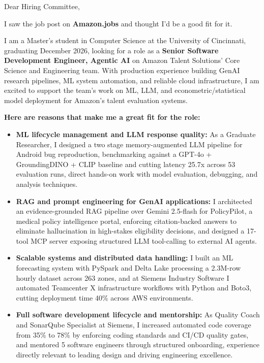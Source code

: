 \documentclass[11pt]{letter}
\date{}
\begin{document}
\begin{letter}{}

\opening{Dear Hiring Committee,}

I saw the job post on \textbf{Amazon.jobs} and thought I'd be a good fit for it.

I am a Master's student in Computer Science at the University of Cincinnati, graduating December 2026, looking for a role as a \textbf{Senior Software Development Engineer, Agentic AI} on Amazon Talent Solutions' Core Science and Engineering team. With production experience building GenAI research pipelines, ML system automation, and reliable cloud infrastructure, I am excited to support the team's work on ML, LLM, and econometric/statistical model deployment for Amazon's talent evaluation systems.

\textbf{Here are reasons that make me a great fit for the role:}

\begin{itemize}[leftmargin=*, itemsep=0.45em]
    \item \textbf{ML lifecycle management and LLM response quality:} As a Graduate Researcher, I designed a two stage memory-augmented LLM pipeline for Android bug reproduction, benchmarking against a GPT-4o + GroundingDINO + CLIP baseline and cutting latency 25.7x across 53 evaluation runs, direct hands-on work with model evaluation, debugging, and analysis techniques.

    \item \textbf{RAG and prompt engineering for GenAI applications:} I architected an evidence-grounded RAG pipeline over Gemini 2.5-flash for PolicyPilot, a medical policy intelligence portal, enforcing citation-backed answers to eliminate hallucination in high-stakes eligibility decisions, and designed a 17-tool MCP server exposing structured LLM tool-calling to external AI agents.

    \item \textbf{Scalable systems and distributed data handling:} I built an ML forecasting system with PySpark and Delta Lake processing a 2.3M-row hourly dataset across 263 zones, and at Siemens Industry Software I automated Teamcenter X infrastructure workflows with Python and Boto3, cutting deployment time 40\% across AWS environments.

    \item \textbf{Full software development lifecycle and mentorship:} As Quality Coach and SonarQube Specialist at Siemens, I increased automated code coverage from 35\% to 78\% by enforcing coding standards and CI/CD quality gates, and mentored 5 software engineers through structured onboarding, experience directly relevant to leading design and driving engineering excellence.
\end{itemize}


\end{letter}
\end{document}
